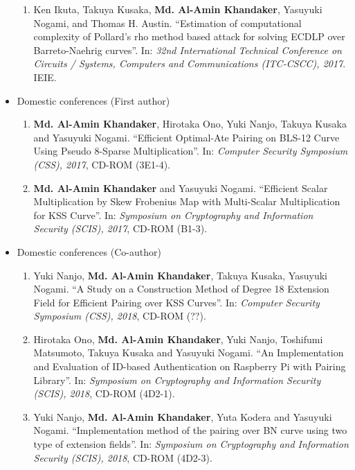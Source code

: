 \begin{itemize}
\begin{enumerate}
	\item Ken Ikuta, Takuya Kusaka, \textbf{Md. Al-Amin Khandaker}, Yasuyuki Nogami, and Thomas H. Austin. ``Estimation of computational complexity of Pollard's rho method based attack for solving ECDLP over Barreto-Naehrig curves''. In: \textit{32nd International Technical Conference on Circuits / Systems, Computers and Communications (ITC-CSCC), 2017}. IEIE. 
\end{enumerate}
\vspace{10mm}
\large
\item \Large Domestic conferences (First author)
	\normalsize
\begin{enumerate}
	
	\item \textbf{Md. Al-Amin Khandaker}, Hirotaka Ono, Yuki Nanjo, Takuya Kusaka and Yasuyuki Nogami. ``Efficient Optimal-Ate Pairing on BLS-12 Curve Using Pseudo 8-Sparse Multiplication''. In: \textit{Computer Security Symposium  (CSS),  2017}, CD-ROM (3E1-4). 
	
	\item \textbf{Md. Al-Amin Khandaker} and Yasuyuki Nogami. ``Efficient Scalar Multiplication by Skew Frobenius Map with Multi-Scalar Multiplication for KSS Curve''. In: \textit{Symposium on Cryptography and Information Security (SCIS),  2017}, CD-ROM (B1-3). 
\end{enumerate}

	\vspace{10mm}
	\large
	\item \Large Domestic conferences (Co-author)
	\normalsize
\begin{enumerate}
	\item Yuki Nanjo,  \textbf{Md. Al-Amin Khandaker}, Takuya Kusaka, Yasuyuki Nogami. ``A Study on a Construction Method of Degree 18 Extension Field for Efficient Pairing over KSS Curves''. In: \textit{Computer Security Symposium  (CSS),  2018}, CD-ROM (??). 
	
	\item  Hirotaka Ono, \textbf{Md. Al-Amin Khandaker}, Yuki Nanjo, Toshifumi Matsumoto, Takuya Kusaka and Yasuyuki Nogami. ``An Implementation and Evaluation of ID-based Authentication on Raspberry Pi with Pairing Library''. In: \textit{Symposium on Cryptography and Information Security (SCIS),  2018}, CD-ROM (4D2-1).  
	
	\item Yuki Nanjo, \textbf{Md. Al-Amin Khandaker}, Yuta Kodera and Yasuyuki Nogami. ``Implementation method of the pairing over BN curve using two type of extension fields''. In: \textit{Symposium on Cryptography and Information Security (SCIS),  2018}, CD-ROM (4D2-3).
	

\end{enumerate}
\end{itemize}
